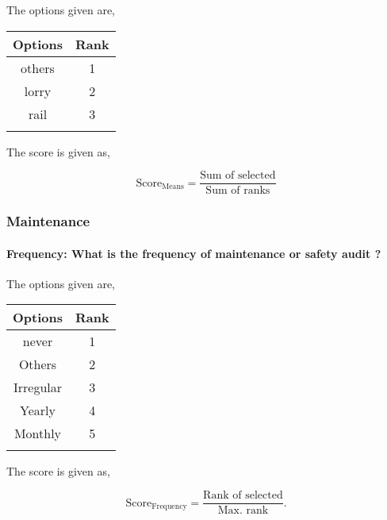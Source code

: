 \documentclass[oneside,twocolumn]{article}
\newcommand{\tsub}[2]{\text{#1}_{\text{#2}}}
\newcommand{\dsub}[2]{\dfrac{\text{#1}}{\text{#2}}}
\newcommand{\multsel}[1]
{
	\[
		\tsub{Score}{#1} = \dsub{Sum of selected}{Sum of ranks}
	\]
}
\newcommand{\singsel}[1]
{
	\[
		\tsub{Score}{#1} = \dsub{Rank of selected}{Max. rank}.
	\]
}
\newenvironment{ttable}
{
\begin{center}
\begin{tabular}{c|c}
\hline
}
{
\\ \hline
\end{tabular}
\end{center}
}
\begin{document}
The options given are,
\begin{ttable}
Options & Rank \\ \hline
others & 1 \\
lorry & 2 \\
rail & 3 \\
\hline
\end{ttable}
The score is given as,
\multsel{Means}
\subsubsection{Maintenance}

\paragraph{Frequency: What is the frequency of  maintenance or safety audit ?}

The options given are,
\begin{ttable}
Options & Rank \\ \hline
never & 1 \\
Others & 2 \\
Irregular & 3 \\
Yearly & 4 \\
Monthly & 5 \\
\hline
\end{ttable}
The score is given as,
\singsel{Frequency}
\end{document}
